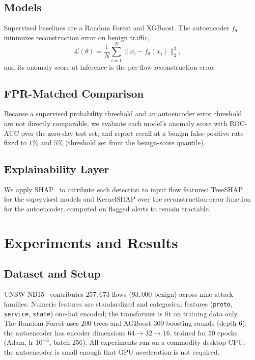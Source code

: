 \documentclass[conference]{IEEEtran}
\begin{document}
\subsection{Models}
Supervised baselines are a Random Forest and XGBoost. The autoencoder $f_\theta$
minimizes reconstruction error on benign traffic,
\begin{equation}
\mathcal{L}(\theta) = \frac{1}{N}\sum_{i=1}^{N}\lVert x_i - f_\theta(x_i)\rVert_2^2 ,
\end{equation}
and its anomaly score at inference is the per-flow reconstruction error.

\subsection{FPR-Matched Comparison}
Because a supervised probability threshold and an autoencoder error threshold are
not directly comparable, we evaluate each model's anomaly score with ROC-AUC over
the zero-day test set, and report recall at a benign false-positive rate fixed to
$1\%$ and $5\%$ (threshold set from the benign-score quantile).

\subsection{Explainability Layer}
We apply SHAP~\cite{shap} to attribute each detection to input flow features: TreeSHAP for the
supervised models and KernelSHAP over the reconstruction-error function for the
autoencoder, computed on flagged alerts to remain tractable.

\section{Experiments and Results}
\subsection{Dataset and Setup}
UNSW-NB15~\cite{unsw_nb15} contributes $257{,}673$ flows ($93{,}000$ benign) across
nine attack families. Numeric features are standardized and categorical features
(\texttt{proto}, \texttt{service}, \texttt{state}) one-hot encoded; the transformer
is fit on training data only. The Random Forest uses $200$ trees and XGBoost $300$
boosting rounds (depth $6$); the autoencoder has encoder dimensions
$64\!\to\!32\!\to\!16$, trained for $50$ epochs (Adam, lr $10^{-3}$, batch $256$).
All experiments run on a commodity desktop CPU; the autoencoder is small enough that GPU
acceleration is not required.
\end{document}
